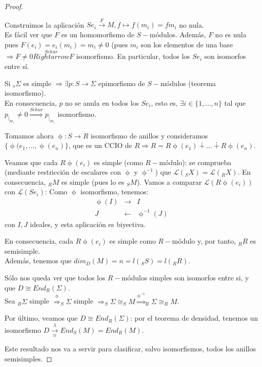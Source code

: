 \documentclass[11pt,a4paper]{article}
\theoremstyle{break}
\begin{document}
\begin{proof}
\begin{enumerate}
Construimos la aplicación $Se_{i} \overset{F}{\to}M, f \mapsto f(m_{i}) = fm_{i}$ no nula. \\
Es fácil ver que $F$ es un homomorfismo de $S-$módulos. Además, $F$ no es nula pues $F(e_{i}) = e_{i}(m_{i}) = m_{i} \neq 0$ (pues $m_{i}$ son los elementos de una base $\Rightarrow F \neq 0 \overset{Schur}{Rightarrow} F$ isomorfismo. En particular, todos los $Se_{i}$ son isomorfos entre sí.

Si $_{s}\Sigma$ es simple $\Rightarrow \exists p: S \to \Sigma$ epimorfismo de $S-$módulos (teorema isomorfismo). \\
En consecuencia, $p$ no se anula en todos los $Se_{i}$, esto es, $\exists i \in \{1, \dots, n\}$ tal que $p_{\mid_{Se_{i}}} \neq 0 \overset{Schur}{\Rightarrow} p_{\mid_{Se_{i}}}$ isomorfismo.

Tomamos ahora $\upphi: S \to R$ isomorfismo de anillos y consideramos $\{\upphi(e_{1}, \dots, \upphi(e_{n})\}$, que es un CCIO de $R \Rightarrow R = R\upphi(e_{1}) \dotplus \dots \dotplus R\upphi(e_{n})$.

Veamos que cada $R\upphi(e_{i})$ es simple (como $R-$módulo): se comprueba (mediante restricción de escalares con $\upphi$ y $\upphi^{-1}$) que $\mathcal{L}(_{S}X) = \mathcal{L}(_{R}X)$. En consecuencia, $_{R}M$ es simple (pues lo es $_{S}M$). Vamos a comparar $\mathcal{L}(R\upphi(e_{i}))$ con $\mathcal{L}(Se_{i})$: Como $\upphi$ isomorfismo, tenemos:
$$\begin{aligned}
\upphi(I) & \to & I \\
J & \gets & \upphi^{-1}(J)
\end{aligned}$$
con $I, J$ ideales, y esta aplicación es biyectiva.

En consecuencia, cada $R\upphi(e_{i})$ es simple como $R-$módulo y, por tanto, $_{R}R$ es semisimple. \\
Además, tenemos que $dim_{D}(M) = n = l(_{S}S) = l(_{R}R)$.

Sólo nos queda ver que todos los $R-$módulos simples son isomorfos entre si, y que $D \cong End_{R}(\Sigma)$. \\
Sea $_{R}\Sigma$ simple $\overset{\upphi}{\Rightarrow} _{S}\Sigma$ simple $\Rightarrow _{S}\Sigma \cong _{S}M \overset{\upphi^{-1}}{\Rightarrow} _{R}\Sigma \cong _{R}M$.

Por último, veamos que $D \cong End_{R}(\Sigma)$: por el teorema de densidad, tenemos un isomorfismo $D \overset{\lambda}{\underset{\cong}{\to}} End_{S}(M) = End_{R}(M)$.
\end{enumerate}

Este resultado nos va a servir para clasificar, salvo isomorfismos, todos los anillos semisimples.
\end{proof}
\end{document}
